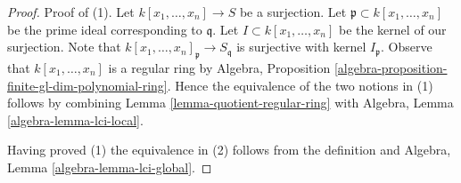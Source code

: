\documentclass{stacks-project}
\theoremstyle{plain}
\theoremstyle{definition}
\theoremstyle{remark}
\numberwithin{equation}{subsection}
\begin{document}
\begin{proof}
Proof of (1). Let $k[x_1, \ldots, x_n] \to S$ be a surjection.
Let $\mathfrak p \subset k[x_1, \ldots, x_n]$ be the prime ideal
corresponding to $\mathfrak q$.
Let $I \subset k[x_1, \ldots, x_n]$ be the kernel of our surjection.
Note that $k[x_1, \ldots, x_n]_\mathfrak p \to S_\mathfrak q$
is surjective with kernel $I_\mathfrak p$. Observe that
$k[x_1, \ldots, x_n]$ is a regular ring by
Algebra, Proposition \ref{algebra-proposition-finite-gl-dim-polynomial-ring}.
Hence the equivalence of the two notions in (1) follows by
combining
Lemma \ref{lemma-quotient-regular-ring}
with Algebra, Lemma \ref{algebra-lemma-lci-local}.

\medskip\noindent
Having proved (1) the equivalence in (2) follows from the
definition and Algebra, Lemma \ref{algebra-lemma-lci-global}.
\end{proof}
\end{document}
